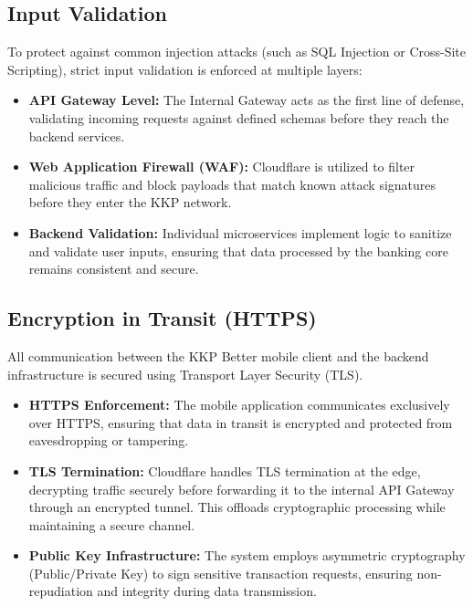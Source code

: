 \documentclass[12pt,oneside,openright,a4paper]{cpe-english-project}
\begin{document}
\subsection{Input Validation}

To protect against common injection attacks (such as SQL Injection or
Cross-Site Scripting), strict input validation is enforced at multiple
layers:

\begin{itemize}
\item
  \textbf{API Gateway Level:} The Internal Gateway acts as the first
  line of defense, validating incoming requests against defined schemas
  before they reach the backend services.
\item
  \textbf{Web Application Firewall (WAF):} Cloudflare is utilized to
  filter malicious traffic and block payloads that match known attack
  signatures before they enter the KKP network.
\item
  \textbf{Backend Validation:} Individual microservices implement logic
  to sanitize and validate user inputs, ensuring that data processed by
  the banking core remains consistent and secure.
\end{itemize}

\subsection{Encryption in Transit (HTTPS)}

All communication between the KKP Better mobile client and the backend
infrastructure is secured using Transport Layer Security (TLS).

\begin{itemize}
\item
  \textbf{HTTPS Enforcement:} The mobile application communicates
  exclusively over HTTPS, ensuring that data in transit is encrypted and
  protected from eavesdropping or tampering.
\item
  \textbf{TLS Termination:} Cloudflare handles TLS termination at the
  edge, decrypting traffic securely before forwarding it to the internal
  API Gateway through an encrypted tunnel. This offloads cryptographic
  processing while maintaining a secure channel.
\item
  \textbf{Public Key Infrastructure:} The system employs asymmetric
  cryptography (Public/Private Key) to sign sensitive transaction
  requests, ensuring non-repudiation and integrity during data
  transmission.
\end{itemize}
\end{document}
